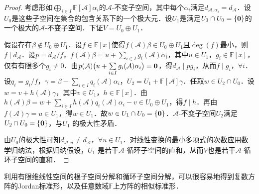 \documentclass[a4paper,fontset=windows]{ctexbook}
\theoremstyle{definition}
\begin{document}
\begin{proof}
考虑形如$\bigoplus\limits_{i\in I}\mathbb{F}[\mathcal{A}]\alpha_i$的$\mathcal{A}$-不变子空间，其中每个$\alpha_i$满足$d_{\mathcal{A},\alpha_i}=d_{\mathcal{A}}$．设$U_0$是这些子空间在集合的包含关系下的一个极大元．设$U_1$是满足$U_1\cap U_0=\{{\bf 0}\}$的一个极大的$\mathcal{A}$-不变子空间．下证$V=U_0\oplus U_1$．

假设存在$\beta\notin U_0\oplus U_1$．设$f\in\mathbb{F}[x]$使得$f(\mathcal{A})\beta\in U_0\oplus U_1$且$\deg(f)$最小，则$f\mid d_{\mathcal{A}}$．设$p=d_{\mathcal{A}}/f$，$f(\mathcal{A})\beta=u+\sum\limits_{i\in I}g_i(\mathcal{A})\alpha_i$，其中$u\in U_1$，$g_i\in\mathbb{F}[x]$，仅有有限多个$g_i\ne 0$．由$p(\mathcal{A})\bigl(u+\sum\limits_{i\in I}g_i(\mathcal{A})\alpha_i\bigr)={\bf 0}$，得$d_{\mathcal{A}}\mid pg_i$，从而$f\mid g_i$，$\forall i$．设$q_i=g_i/f$，$\gamma=\beta-\sum\limits_{i\in I}q_i(\mathcal{A})\alpha_i$，$U_2=U_1+\mathbb{F}[\mathcal{A}]\gamma$．任取$w\in U_2\cap U_0$．设$w=v+h(\mathcal{A})\gamma$，其中$v\in U_1$，$h\in\mathbb{F}[x]$．由$h(\mathcal{A})\beta=w+\sum\limits_{i\in I}h(\mathcal{A})q_i(\mathcal{A})\alpha_i-v\in U_0\oplus U_1$，得$f\mid h$．再由$f(\mathcal{A})\gamma=u\in U_1$，得$w\in U_1$．故$w\in U_1\cap U_0=\{\bf 0\}$．$\mathcal{A}$-不变子空间$U_2$满足$U_2\cap U_0=\{\bf 0\}$，与$U_1$ 的极大性矛盾．

由$U_0$的极大性可知$d_{\mathcal{A},u}\ne d_{\mathcal{A}}$，$\forall u\in U_1$．对线性变换的最小多项式的次数应用数学归纳法，根据归纳假设，$U_1$ 是若干$\mathcal{A}$-循环子空间的直和，从而$V$也是若干$\mathcal{A}$-循环子空间的直和．
\end{proof}

利用有限维线性空间的根子空间分解和循环子空间分解，可以很容易地得到复数方阵的Jordan标准形，以及任意数域$\mathbb{F}$上方阵的相似标准形．
\end{document}
